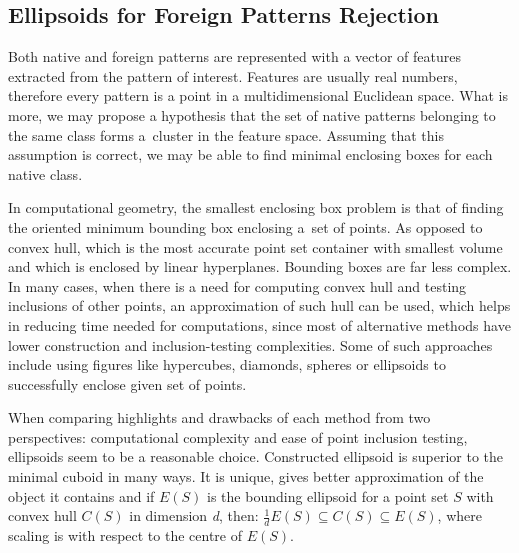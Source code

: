\documentclass{llncs}
\begin{document}

\vspace{-6pt}
\subsection{Ellipsoids for Foreign Patterns Rejection}
  \label{sec:Ellipsoids}
\vspace{-3pt}

Both native and foreign patterns are represented with a vector of features extracted from the pattern of interest. Features are usually real numbers, therefore every pattern is a point in a multidimensional Euclidean space. What is more, we may propose a hypothesis that the set of native patterns belonging to the same class forms a~cluster in the feature space. Assuming that this assumption is correct, we may be able to find  minimal enclosing boxes for each native class.

In computational geometry, the smallest enclosing box problem is that of finding the oriented minimum bounding box enclosing a~set of points. As opposed to convex hull, which is the most accurate point set container with smallest volume and which is enclosed by linear hyperplanes. Bounding boxes are far less complex. In many cases, when there is a need for computing convex hull and testing inclusions of other points, an approximation of such hull can be used, which helps in reducing time needed for computations, since most of alternative methods have lower construction and inclusion-testing complexities. Some of such approaches include using figures like hypercubes, diamonds, spheres or ellipsoids to successfully enclose given set of points.

When comparing highlights and drawbacks of each method from two perspectives: computational complexity and ease of point inclusion testing, ellipsoids seem to be a reasonable choice. Constructed ellipsoid is superior to the minimal cuboid in many ways. It is unique, gives better approximation of the object it contains and if $E(S)$ is the bounding ellipsoid for a point set $S$ with convex hull $C(S)$ in dimension \textit{d}, then: $\frac{1}{d}E(S) \subseteq C(S) \subseteq E(S)$, where scaling is with respect to the centre of $E(S)$.
\end{document}
